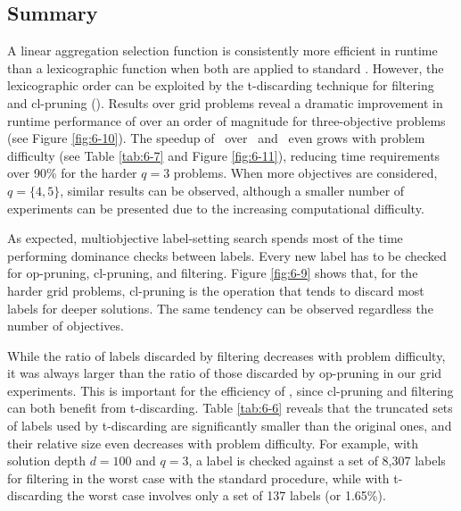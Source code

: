 \subsection{Summary}
\label{chapEmpiricalAnalysis:subsec:summarygridsnamoate}

A linear aggregation selection function is consistently more efficient in runtime than a lexicographic function when both are applied to standard \namoa. However, the lexicographic order can be exploited by the t-discarding technique for filtering and cl-pruning (\namoate). Results over grid problems reveal a dramatic improvement in runtime performance of over an order of magnitude for three-objective problems (see Figure \ref{fig:6-10}). The speedup of \namoate \ over \namoalex \ and \namoalin \ even grows with problem difficulty (see Table \ref{tab:6-7} and Figure \ref{fig:6-11}), reducing time requirements over 90\% for the harder $q = 3$ problems. When more objectives are considered, $q=\{4,5\}$, similar results can be observed, although a smaller number of experiments can be presented due to the increasing computational difficulty.  

As expected, multiobjective label-setting search spends most of the time performing dominance checks between labels. Every new label has to be checked for op-pruning, cl-pruning, and filtering. Figure \ref{fig:6-9} shows that, for the harder grid problems, cl-pruning is the operation that tends to discard most labels for deeper solutions. The same tendency can be observed regardless the number of objectives. 

While the ratio of labels discarded by filtering decreases with problem difficulty, it was always larger than the ratio of those discarded by op-pruning in our grid experiments. This is important for the efficiency of \namoate, since cl-pruning and filtering can both benefit from t-discarding. Table \ref{tab:6-6} reveals that the truncated sets of labels used by t-discarding are significantly smaller than the original ones, and their relative size even decreases with problem difficulty. For example, with solution depth $d = 100$ and $q = 3$, a label is checked against a set of 8,307 labels for filtering in the worst case with the standard procedure, while with t-discarding the worst case involves only a set of 137 labels (or 1.65\%). 

